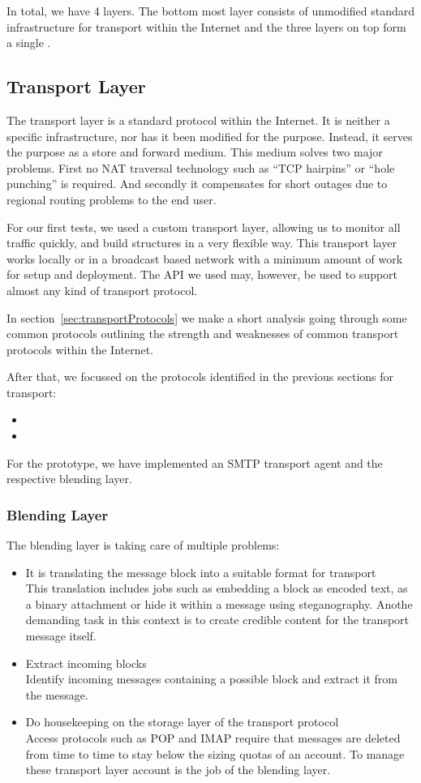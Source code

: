 In total, we have 4 layers. The bottom most layer consists of unmodified standard infrastructure for transport within the Internet and the three layers on top form a single \VortexNode.

\subsection{Transport Layer}
The transport layer is a standard protocol within the Internet. It is neither a \MessageVortex specific infrastructure, nor has it been modified for the purpose. Instead, it serves the purpose as a store and forward medium. This medium solves two major problems. First no NAT traversal technology such as ``TCP hairpins'' or ``hole punching'' is required. And secondly it compensates for short outages due to regional routing problems to the end user.

For our first tests, we used a custom transport layer, allowing us to monitor all traffic quickly, and build structures in a very flexible way. This transport layer works locally or in a broadcast based network with a minimum amount of work for setup and deployment. The API we used may, however, be used to support almost any kind of transport protocol.

In section~\ref{sec:transportProtocols} we make a short analysis going through some common protocols outlining the strength and weaknesses of common transport protocols within the Internet.

After that, we focussed on the protocols identified in the previous sections for transport:
\begin{itemize}
	\item {}
	\item {}
\end{itemize}
For the prototype, we have implemented an SMTP transport agent and the respective blending layer.

\subsubsection{Blending Layer\label{sec:blendingLayer}}
The blending layer is taking care of multiple problems:
\begin{itemize}
	\item It is translating the message block into a suitable format for transport\\
	This translation includes jobs such as embedding a block as encoded text, as a binary attachment or hide it within a message using steganography. Anothe demanding task in this context is to create credible content for the transport message itself.
	\item Extract incoming blocks\\
	Identify incoming messages containing a possible block and extract it from the message.
	\item Do housekeeping on the storage layer of the transport protocol\\
	Access protocols such as POP and IMAP require that messages are deleted from time to time to stay below the sizing quotas of an account. To manage these transport layer account is the job of the blending layer.
\end{itemize}

